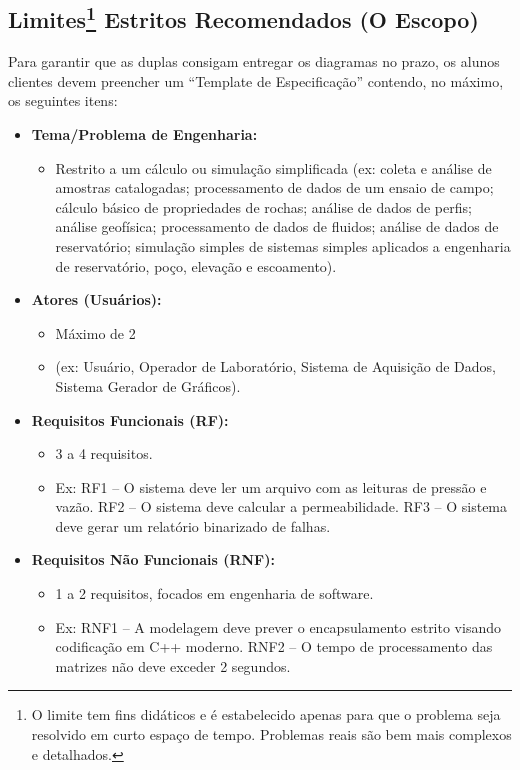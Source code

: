\documentclass[12pt,a4paper]{article}
\begin{document}
\subsection*{Limites\footnote{O limite tem fins didáticos e é estabelecido apenas para que o problema seja resolvido em curto espaço de tempo. Problemas reais são bem mais complexos e detalhados.} Estritos Recomendados (O Escopo)}

Para garantir que as duplas consigam entregar os diagramas no prazo, os alunos clientes devem preencher um ``Template de Especificação'' contendo, no máximo, os seguintes itens:

\begin{itemize}
  \item \textbf{Tema/Problema de Engenharia:}
  \begin{itemize}
    \item Restrito a um cálculo ou simulação simplificada (ex: coleta e análise de amostras catalogadas; processamento de dados de um ensaio de campo; cálculo básico de propriedades de rochas; análise de dados de perfis; análise geofísica; processamento de dados de fluidos; análise de dados de reservatório; simulação simples de sistemas simples aplicados a engenharia de reservatório, poço, elevação e escoamento).
  \end{itemize}

  \item \textbf{Atores (Usuários):}
  \begin{itemize}
    \item Máximo de 2
    \item (ex: Usuário, Operador de Laboratório, Sistema de Aquisição de Dados, Sistema Gerador de Gráficos).
  \end{itemize}

  \item \textbf{Requisitos Funcionais (RF):}
  \begin{itemize}
    \item 3 a 4 requisitos.
    \item Ex: RF1 -- O sistema deve ler um arquivo com as leituras de pressão e vazão. RF2 -- O sistema deve calcular a permeabilidade. RF3 -- O sistema deve gerar um relatório binarizado de falhas.
  \end{itemize}

  \item \textbf{Requisitos Não Funcionais (RNF):}
  \begin{itemize}
    \item 1 a 2 requisitos, focados em engenharia de software.
    \item Ex: RNF1 -- A modelagem deve prever o encapsulamento estrito visando codificação em C++ moderno. RNF2 -- O tempo de processamento das matrizes não deve exceder 2 segundos.
  \end{itemize}


\end{itemize}
\end{document}
